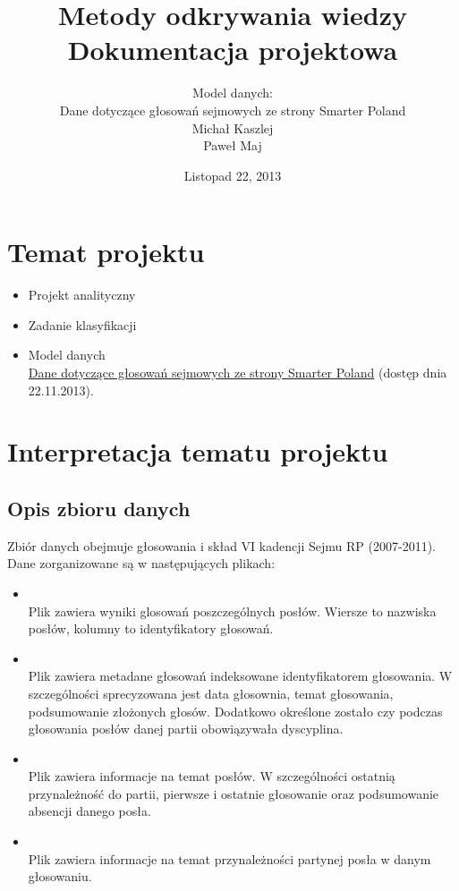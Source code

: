 \documentclass[a4 14pt]{report}
\title{Metody odkrywania wiedzy\\Dokumentacja projektowa}
\author{Model danych:\\Dane dotyczące głosowań sejmowych ze strony Smarter Poland\\[2cm]Michał Kaszlej\\Paweł Maj}
\date{Listopad 22, 2013}
\begin{document}
\begin{titlepage}

\maketitle

\end{titlepage}

	\section{Temat projektu}
		
		\begin{itemize}
			\item{Projekt analityczny}
			\item{Zadanie klasyfikacji}
			\item{Model danych}\\
				\href{http://tofesi.mimuw.edu.pl/~cogito/smarterpoland/GlosowaniaPoslow/}{Dane dotyczące głosowań sejmowych ze strony Smarter Poland} (dostęp dnia 22.11.2013).
		\end{itemize}
		

	\section{Interpretacja tematu projektu}

		\subsection{Opis zbioru danych}
			Zbiór danych obejmuje głosowania i skład VI kadencji Sejmu RP (2007-2011).
			Dane zorganizowane są w następujących plikach:
			\begin{itemize}
				\item{}\\
					Plik zawiera wyniki glosowań poszczególnych posłów. Wiersze to nazwiska posłów, kolumny to identyfikatory głosowań.
				\item{}\\
					Plik zawiera metadane głosowań indeksowane identyfikatorem głosowania.
					W szczególności sprecyzowana jest data głosownia, temat głosowania, podsumowanie złożonych głosów. 
					Dodatkowo określone zostało czy podczas głosowania posłów danej partii obowiązywała dyscyplina.
				\item{}\\
					Plik zawiera informacje na temat posłów. W szczególności ostatnią przynależność do partii, pierwsze i ostatnie głosowanie oraz podsumowanie absencji danego posła.
				\item{}\\
					Plik zawiera informacje na temat przynależności partynej posła w danym głosowaniu.
			\end{itemize}
			
\end{document}
